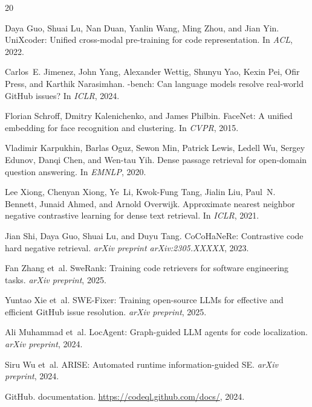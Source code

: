 \documentclass[11pt,a4paper]{article}
\begin{document}
\begin{thebibliography}{20}

Daya Guo, Shuai Lu, Nan Duan, Yanlin Wang, Ming Zhou, and Jian Yin.
\newblock UniXcoder: Unified cross-modal pre-training for code representation.
\newblock In \emph{ACL}, 2022.

Carlos~E. Jimenez, John Yang, Alexander Wettig, Shunyu Yao, Kexin Pei, Ofir Press, and Karthik Narasimhan.
-bench: Can language models resolve real-world {GitHub} issues?
\newblock In \emph{ICLR}, 2024.

Florian Schroff, Dmitry Kalenichenko, and James Philbin.
\newblock FaceNet: A unified embedding for face recognition and clustering.
\newblock In \emph{CVPR}, 2015.

Vladimir Karpukhin, Barlas Oguz, Sewon Min, Patrick Lewis, Ledell Wu, Sergey Edunov, Danqi Chen, and Wen-tau Yih.
\newblock Dense passage retrieval for open-domain question answering.
\newblock In \emph{EMNLP}, 2020.

Lee Xiong, Chenyan Xiong, Ye~Li, Kwok-Fung Tang, Jialin Liu, Paul~N. Bennett, Junaid Ahmed, and Arnold Overwijk.
\newblock Approximate nearest neighbor negative contrastive learning for dense text retrieval.
\newblock In \emph{ICLR}, 2021.

Jian Shi, Daya Guo, Shuai Lu, and Duyu Tang.
\newblock CoCoHaNeRe: Contrastive code hard negative retrieval.
\newblock \emph{arXiv preprint arXiv:2305.XXXXX}, 2023.

Fan Zhang et~al.
\newblock SweRank: Training code retrievers for software engineering tasks.
\newblock \emph{arXiv preprint}, 2025.

Yuntao Xie et~al.
\newblock SWE-Fixer: Training open-source LLMs for effective and efficient GitHub issue resolution.
\newblock \emph{arXiv preprint}, 2025.

Ali Muhammad et~al.
\newblock LocAgent: Graph-guided LLM agents for code localization.
\newblock \emph{arXiv preprint}, 2024.

Siru Wu et~al.
\newblock ARISE: Automated runtime information-guided SE.
\newblock \emph{arXiv preprint}, 2024.

{GitHub}.
 documentation.
\newblock \url{https://codeql.github.com/docs/}, 2024.

\end{thebibliography}
\end{document}
